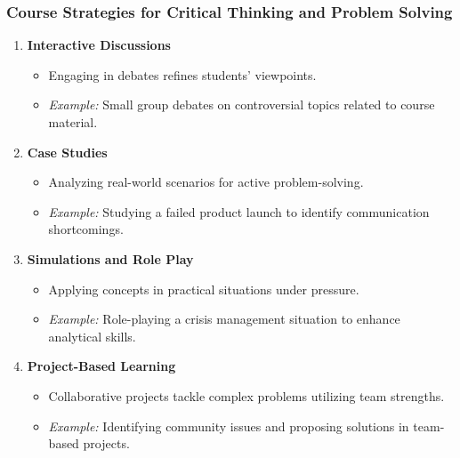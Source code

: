 \documentclass[aspectratio=169]{beamer}
\begin{document}
\begin{frame}[fragile]
    \frametitle{Course Strategies for Critical Thinking and Problem Solving}
    
    \begin{enumerate}
        \item \textbf{Interactive Discussions}
        \begin{itemize}
            \item Engaging in debates refines students' viewpoints.
            \item \textit{Example:} Small group debates on controversial topics related to course material.
        \end{itemize}
        
        \item \textbf{Case Studies}
        \begin{itemize}
            \item Analyzing real-world scenarios for active problem-solving.
            \item \textit{Example:} Studying a failed product launch to identify communication shortcomings.
        \end{itemize}
        
        \item \textbf{Simulations and Role Play}
        \begin{itemize}
            \item Applying concepts in practical situations under pressure.
            \item \textit{Example:} Role-playing a crisis management situation to enhance analytical skills.
        \end{itemize}
        
        \item \textbf{Project-Based Learning}
        \begin{itemize}
            \item Collaborative projects tackle complex problems utilizing team strengths.
            \item \textit{Example:} Identifying community issues and proposing solutions in team-based projects.
        \end{itemize}
    \end{enumerate}
\end{frame}
\end{document}
